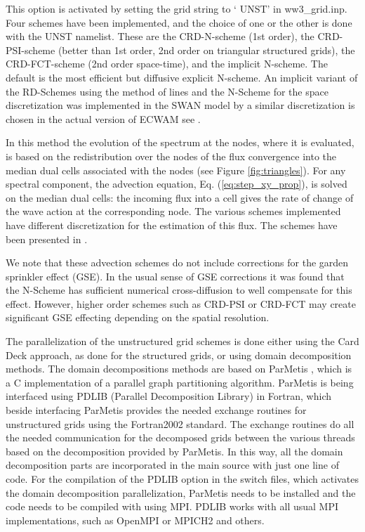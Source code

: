This option is activated by setting the grid string to `{\code
UNST}' in {\file ww3\_grid.inp}.  Four schemes have been implemented, and the
choice of one or the other is done with the {\code UNST} namelist.  These are
the CRD-N-scheme (1st order), the CRD-PSI-scheme (better than 1st order, 2nd
order on triangular structured grids), the CRD-FCT-scheme (2nd order
space-time), and the implicit N-scheme. The default is the most efficient but
diffusive explicit N-scheme. An implicit variant of the RD-Schemes
using the method of lines and the N-Scheme for the space discretization was
implemented in the SWAN model by \cite{art:Zij10}  a similar discretization
is chosen in the actual version of ECWAM see \cite{pro:rol2012}.

In this method the evolution of the spectrum at the nodes, where it is
evaluated, is based on the redistribution over the nodes of the flux
convergence into the median dual cells associated with the nodes (see Figure
\ref{fig:triangles}).  For any spectral component, the advection equation, Eq.
(\ref{eq:step_xy_prop}), is solved on the median dual cells: the incoming flux
into a cell gives the rate of change of the wave action at the corresponding
node. The various schemes implemented have different discretization for the
estimation of this flux. The schemes have been presented in \citep[see][for a
review]{rep:Roland2008}.

We note that these advection schemes do not include corrections for
the garden sprinkler effect (GSE). In the usual sense of GSE corrections
it was found that the N-Scheme has sufficient numerical cross-diffusion
to well compensate for this effect. However, higher order schemes such
as CRD-PSI or CRD-FCT may create significant GSE effecting depending
on the spatial resolution.

The parallelization of the unstructured grid schemes is done either
using the Card Deck approach, as done for the structured grids, or using
domain decomposition methods. The domain decompositions methods are based
on ParMetis \citep{rep:karypis2011metis}, which is a C implementation of a parallel
graph partitioning algorithm. ParMetis is being interfaced using
PDLIB (Parallel Decomposition Library) in Fortran, which beside interfacing
ParMetis provides the needed exchange routines for unstructured
grids using the Fortran2002 standard. The exchange routines do
all the needed communication for the decomposed grids between the
various threads based on the decomposition provided by ParMetis.
In this way, all the domain decomposition parts are incorporated in
the main source with just one line of code. For the compilation of
the PDLIB option in the switch files, which activates the domain
decomposition parallelization, ParMetis needs to be installed
and the code needs to be compiled with using MPI. PDLIB works with
all usual MPI implementations, such as OpenMPI or MPICH2 and others.

